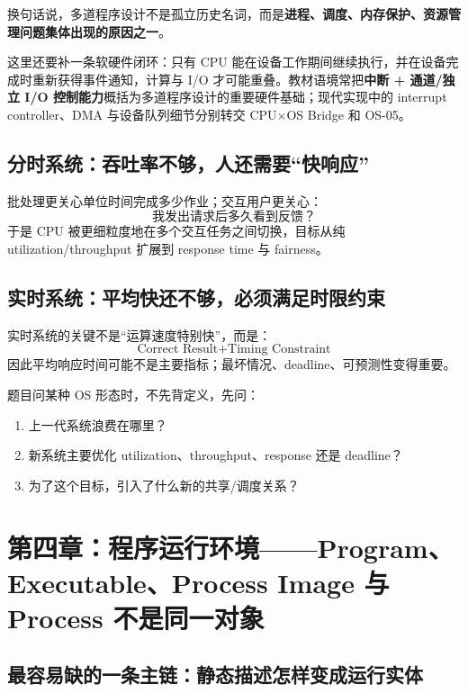 \documentclass[11pt,a4paper]{ctexart}
\newcommand{\kw}[1]{\textbf{#1}}
\begin{document}
换句话说，多道程序设计不是孤立历史名词，而是\kw{进程、调度、内存保护、资源管理问题集体出现的原因之一}。

这里还要补一条软硬件闭环：只有 CPU 能在设备工作期间继续执行，并在设备完成时重新获得事件通知，计算与 I/O 才可能重叠。教材语境常把\kw{中断 + 通道/独立 I/O 控制能力}概括为多道程序设计的重要硬件基础；现代实现中的 interrupt controller、DMA 与设备队列细节分别转交 CPU$\times$OS Bridge 和 OS-05。

\subsection{分时系统：吞吐率不够，人还需要“快响应”}

批处理更关心单位时间完成多少作业；交互用户更关心：
\[
\boxed{\text{我发出请求后多久看到反馈？}}
\]
于是 CPU 被更细粒度地在多个交互任务之间切换，目标从纯 utilization/throughput 扩展到 response time 与 fairness。

\subsection{实时系统：平均快还不够，必须满足时限约束}

实时系统的关键不是“运算速度特别快”，而是：
\[
\boxed{\text{Correct Result} + \text{Timing Constraint}}
\]
因此平均响应时间可能不是主要指标；最坏情况、deadline、可预测性变得重要。

\begin{method}[历史题统一做法]
题目问某种 OS 形态时，不先背定义，先问：
\begin{enumerate}
  \item 上一代系统浪费在哪里？
  \item 新系统主要优化 utilization、throughput、response 还是 deadline？
  \item 为了这个目标，引入了什么新的共享/调度关系？
\end{enumerate}
\end{method}

\section{第四章：程序运行环境——Program、Executable、Process Image 与 Process 不是同一对象}

\subsection{最容易缺的一条主链：静态描述怎样变成运行实体}
\end{document}
